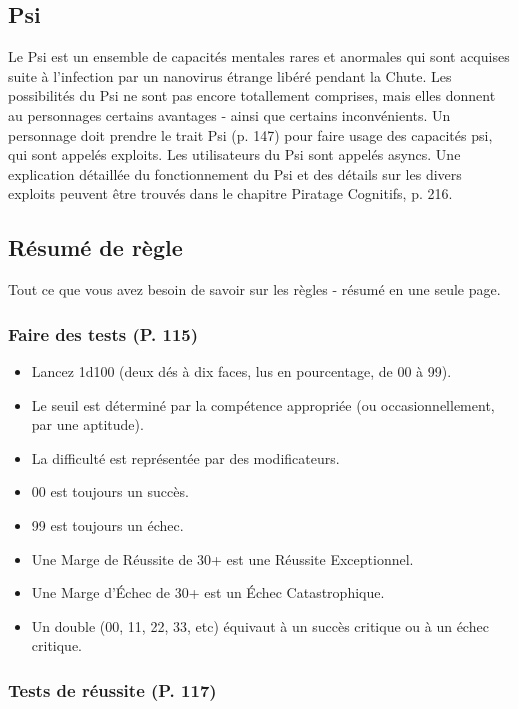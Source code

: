 \subsection{Psi} \label{sec:psi} 

Le Psi est un ensemble de capacités mentales rares et anormales qui sont acquises suite à l'infection par un nanovirus étrange libéré pendant la Chute. Les possibilités du Psi ne sont pas encore totallement comprises, mais elles donnent au personnages certains avantages - ainsi que certains inconvénients. Un personnage doit prendre le trait Psi (p. 147) pour faire usage des capacités psi, qui sont appelés exploits. Les utilisateurs du Psi sont appelés asyncs. Une explication détaillée du fonctionnement du Psi et des détails sur les divers exploits peuvent être trouvés dans le chapitre Piratage Cognitifs, p. 216. 

\subsection{Résumé de règle} \label{sec:game-rules-summary} 

Tout ce que vous avez besoin de savoir sur les règles - résumé en une seule page. 

\subsubsection{Faire des tests (P. 115)} 

\begin{itemize} \item Lancez 1d100 (deux dés à dix faces, lus en pourcentage, de 00 à 99). \item Le seuil est déterminé par la compétence appropriée (ou occasionnellement, par une aptitude). \item La difficulté est représentée par des modificateurs. \item 00 est toujours un succès. \item 99 est toujours un échec. \item Une Marge de Réussite de 30+ est une Réussite Exceptionnel. \item Une Marge d'Échec de 30+ est un Échec Catastrophique. \item Un double (00, 11, 22, 33, etc) équivaut à un succès critique ou à un échec critique. \end{itemize} 

\subsubsection{Tests de réussite (P. 117)} 

